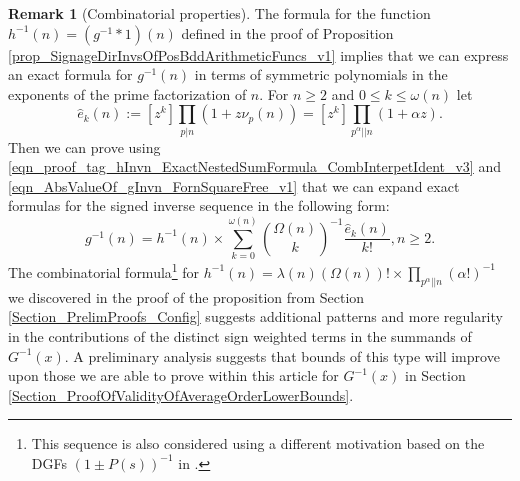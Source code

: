 \documentclass[11pt,reqno,a4letter]{article}
\numberwithin{figure}{section}
\numberwithin{table}{section}
\theoremstyle{plain}
\numberwithin{theorem}{section}
\theoremstyle{definition}
\newtheorem{remark}[theorem]{Remark}
\begin{document}
\begin{remark}[Combinatorial properties]
The formula for the function $h^{-1}(n) = (g^{-1} \ast 1)(n)$ defined in the proof of 
Proposition \ref{prop_SignageDirInvsOfPosBddArithmeticFuncs_v1} implies that we can express 
an exact formula for $g^{-1}(n)$ in terms of symmetric polynomials in the 
exponents of the prime factorization of $n$. 
For $n \geq 2$ and $0 \leq k \leq \omega(n)$ let 
\[
\widehat{e}_k(n) := [z^k] \prod_{p|n} (1 + z \nu_p(n)) = [z^k] \prod_{p^{\alpha} || n} (1 + \alpha z). 
\]
Then we can prove using 
\eqref{eqn_proof_tag_hInvn_ExactNestedSumFormula_CombInterpetIdent_v3} and 
\eqref{eqn_AbsValueOf_gInvn_FornSquareFree_v1} that we can expand exact formulas for 
the signed inverse sequence in the following form: 
\[
g^{-1}(n) = h^{-1}(n) \times \sum_{k=0}^{\omega(n)} \binom{\Omega(n)}{k}^{-1} 
     \frac{\widehat{e}_k(n)}{k!}, n \geq 2. 
\]
The combinatorial formula\footnote{ 
     This sequence is also considered using a different motivation based on the DGFs 
     $(1\pm P(s))^{-1}$ in \cite[\S 2]{FROBERG-1968}. 
} 
for $h^{-1}(n) = \lambda(n) (\Omega(n))! \times \prod_{p^{\alpha} || n} (\alpha !)^{-1}$ 
we discovered in the proof of the proposition from 
Section \ref{Section_PrelimProofs_Config} 
suggests additional patterns and more regularity in the contributions of the distinct sign weighted 
terms in the summands of $G^{-1}(x)$. 
A preliminary analysis suggests that bounds of this type 
will improve upon those we are able to prove within this article for $G^{-1}(x)$ in 
Section \ref{Section_ProofOfValidityOfAverageOrderLowerBounds}. 
\end{remark}
\end{document}
